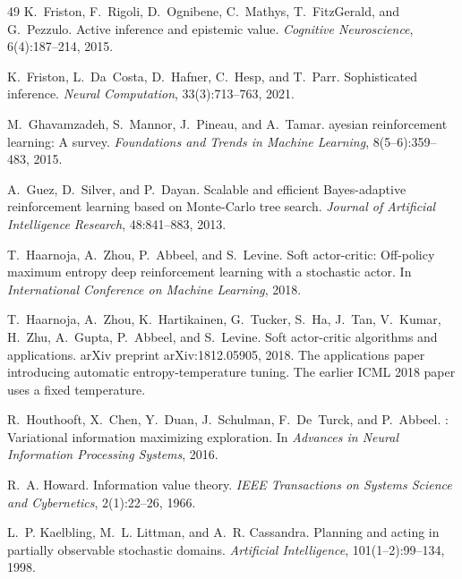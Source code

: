 \documentclass[runningheads]{llncs}
\begin{document}
\begin{thebibliography}{49}
K.~Friston, F.~Rigoli, D.~Ognibene, C.~Mathys, T.~FitzGerald, and G.~Pezzulo.
\newblock Active inference and epistemic value.
\newblock \emph{Cognitive Neuroscience}, 6(4):187--214, 2015.

K.~Friston, L.~Da~Costa, D.~Hafner, C.~Hesp, and T.~Parr.
\newblock Sophisticated inference.
\newblock \emph{Neural Computation}, 33(3):713--763, 2021.

M.~Ghavamzadeh, S.~Mannor, J.~Pineau, and A.~Tamar.
ayesian reinforcement learning: A survey.
\newblock \emph{Foundations and Trends in Machine Learning}, 8(5--6):359--483, 2015.

A.~Guez, D.~Silver, and P.~Dayan.
\newblock Scalable and efficient {B}ayes-adaptive reinforcement learning based on {M}onte-{C}arlo tree search.
\newblock \emph{Journal of Artificial Intelligence Research}, 48:841--883, 2013.

T.~Haarnoja, A.~Zhou, P.~Abbeel, and S.~Levine.
\newblock Soft actor-critic: Off-policy maximum entropy deep reinforcement learning with a stochastic actor.
\newblock In \emph{International Conference on Machine Learning}, 2018.

T.~Haarnoja, A.~Zhou, K.~Hartikainen, G.~Tucker, S.~Ha, J.~Tan, V.~Kumar, H.~Zhu, A.~Gupta, P.~Abbeel, and S.~Levine.
\newblock Soft actor-critic algorithms and applications.
\newblock arXiv preprint arXiv:1812.05905, 2018.
\newblock The applications paper introducing automatic entropy-temperature tuning. The earlier ICML 2018 paper uses a fixed temperature.

R.~Houthooft, X.~Chen, Y.~Duan, J.~Schulman, F.~De~Turck, and P.~Abbeel.
: Variational information maximizing exploration.
\newblock In \emph{Advances in Neural Information Processing Systems}, 2016.

R.~A. Howard.
\newblock Information value theory.
\newblock \emph{IEEE Transactions on Systems Science and Cybernetics}, 2(1):22--26, 1966.

L.~P. Kaelbling, M.~L. Littman, and A.~R. Cassandra.
\newblock Planning and acting in partially observable stochastic domains.
\newblock \emph{Artificial Intelligence}, 101(1--2):99--134, 1998.


\end{thebibliography}
\end{document}
